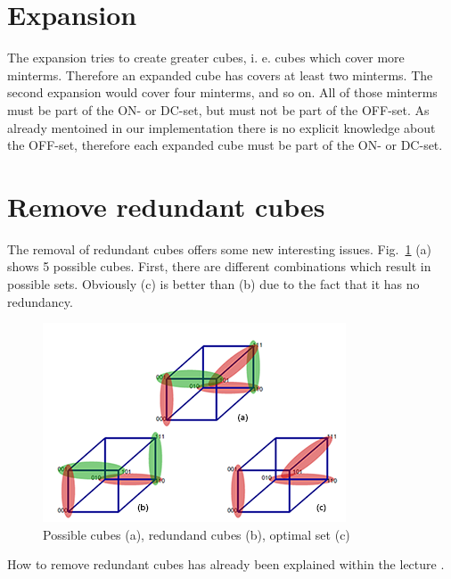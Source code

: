 \documentclass[colorback,accentcolor=tud1c,11pt]{tudreport}
\begin{document}
 \section{Expansion}
 The expansion tries to create greater cubes, i. e. cubes which cover more minterms. Therefore an expanded cube has covers at least two minterms. The second expansion would cover four minterms, and so on. All of those minterms must be part of the ON- or DC-set, but must not be part of the OFF-set. As already mentoined in our implementation there is no explicit knowledge about the OFF-set, therefore each expanded cube must be part of the ON- or DC-set.

 \section{Remove redundant cubes}
 The removal of redundant cubes offers some new interesting issues. Fig.~\ref{fig:redundancy} (a) shows 5 possible cubes. First, there are different combinations which result in possible sets. Obviously (c) is better than (b) due to the fact that it has no redundancy.
 \begin{figure}
   \centering
   \includegraphics{redundancy}
   \caption{Possible cubes (a), redundand cubes (b), optimal set (c)}
   \label{fig:redundancy}
 \end{figure}

 How to remove redundant cubes has already been explained within the lecture \cite{Hochberger2017}. 
 

  
  
\end{document}

